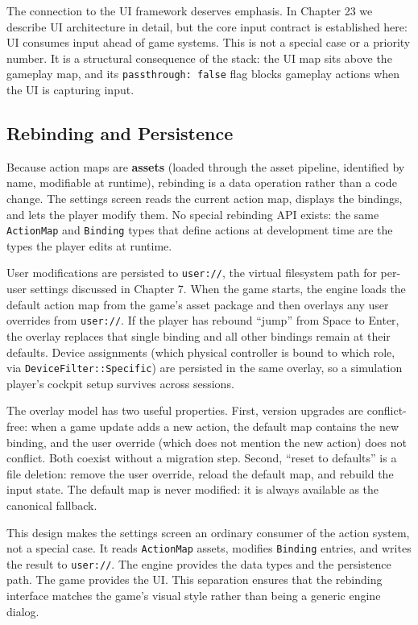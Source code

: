 \documentclass[
  11pt,
  letterpaper,
  DIV=11,
  numbers=noendperiod,
  twoside,
  open=right]{scrreprt}
\begin{document}
The connection to the UI framework deserves emphasis. In Chapter 23 we
describe UI architecture in detail, but the core input contract is
established here: UI consumes input ahead of game systems. This is not a
special case or a priority number. It is a structural consequence of the
stack: the UI map sits above the gameplay map, and its
\texttt{passthrough:\ false} flag blocks gameplay actions when the UI is
capturing input.

\subsection{Rebinding and Persistence}\label{rebinding-and-persistence}

Because action maps are \textbf{assets} (loaded through the asset
pipeline, identified by name, modifiable at runtime), rebinding is a
data operation rather than a code change. The settings screen reads the
current action map, displays the bindings, and lets the player modify
them. No special rebinding API exists: the same \texttt{ActionMap} and
\texttt{Binding} types that define actions at development time are the
types the player edits at runtime.

User modifications are persisted to \texttt{user://}, the virtual
filesystem path for per-user settings discussed in Chapter 7. When the
game starts, the engine loads the default action map from the game's
asset package and then overlays any user overrides from
\texttt{user://}. If the player has rebound ``jump'' from Space to
Enter, the overlay replaces that single binding and all other bindings
remain at their defaults. Device assignments (which physical controller
is bound to which role, via \texttt{DeviceFilter::Specific}) are
persisted in the same overlay, so a simulation player's cockpit setup
survives across sessions.

The overlay model has two useful properties. First, version upgrades are
conflict-free: when a game update adds a new action, the default map
contains the new binding, and the user override (which does not mention
the new action) does not conflict. Both coexist without a migration
step. Second, ``reset to defaults'' is a file deletion: remove the user
override, reload the default map, and rebuild the input state. The
default map is never modified: it is always available as the canonical
fallback.

This design makes the settings screen an ordinary consumer of the action
system, not a special case. It reads \texttt{ActionMap} assets, modifies
\texttt{Binding} entries, and writes the result to \texttt{user://}. The
engine provides the data types and the persistence path. The game
provides the UI. This separation ensures that the rebinding interface
matches the game's visual style rather than being a generic engine
dialog.
\end{document}
